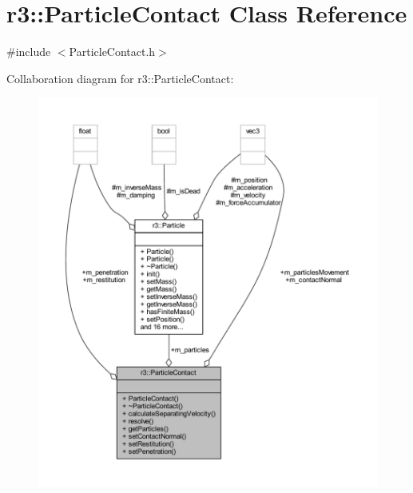 \hypertarget{classr3_1_1_particle_contact}{}\section{r3\+:\+:Particle\+Contact Class Reference}
\label{classr3_1_1_particle_contact}


{\ttfamily \#include $<$Particle\+Contact.\+h$>$}



Collaboration diagram for r3\+:\+:Particle\+Contact\+:\nopagebreak
\begin{figure}[H]
\begin{center}
\leavevmode
\includegraphics[width=350pt]{classr3_1_1_particle_contact__coll__graph}
\end{center}
\end{figure}

